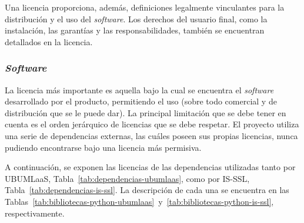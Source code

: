 Una licencia proporciona, además, definiciones legalmente vinculantes para la distribución y el uso del \textit{software}. Los derechos del usuario final, como la instalación,  las garantías y las responsabilidades, también se encuentran detallados en la licencia.


\subsubsection{\textit{Software}}
La licencia más importante es aquella bajo la cual se encuentra el \textit{software} desarrollado por el producto,  permitiendo el uso (sobre todo comercial y de distribución que se le puede dar). La principal limitación que se debe tener en cuenta es el orden jerárquico de licencias que se debe respetar. El proyecto utiliza una serie de dependencias externas, las cuáles poseen sus propias licencias, nunca pudiendo encontrarse bajo una licencia más permisiva.

A continuación, se exponen las licencias de las dependencias utilizadas tanto por UBUMLaaS, Tabla~\ref{tab:dependencias-ubumlaas}, como por IS-SSL, Tabla~\ref{tab:dependencias-is-ssl}. La descripción de cada una se encuentra en las Tablas~\ref{tab:bibliotecas-python-ubumlaas}~y~\ref{tab:bibliotecas-python-is-ssl}, respectivamente.

